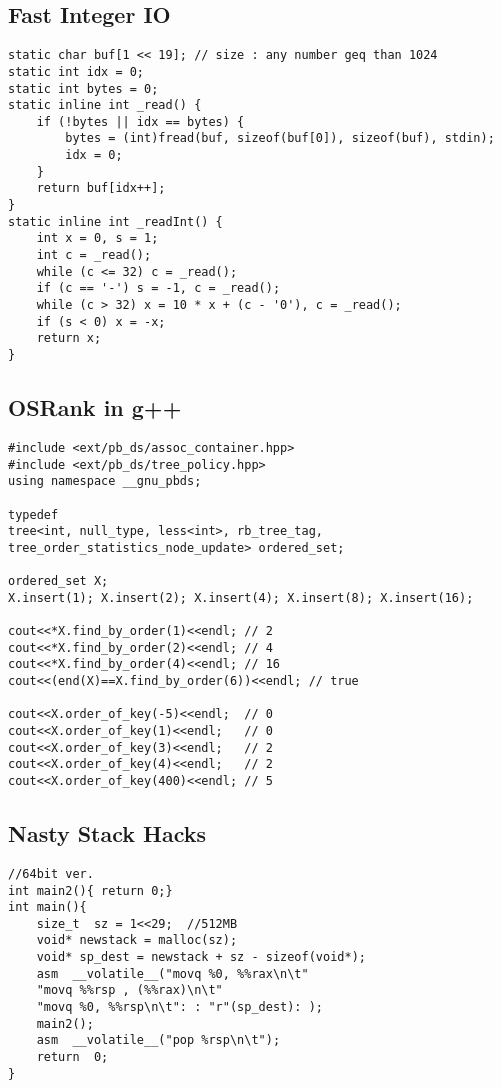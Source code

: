 \documentclass[landscape, 8pt, a4paper, oneside,  twocolumn]{extarticle}
\begin{document}
\subsection {Fast Integer IO}
\begin{verbatim}
static char buf[1 << 19]; // size : any number geq than 1024 
static int idx = 0;
static int bytes = 0;
static inline int _read() {
	if (!bytes || idx == bytes) {
		bytes = (int)fread(buf, sizeof(buf[0]), sizeof(buf), stdin);
		idx = 0;
	}
	return buf[idx++];
}
static inline int _readInt() {
	int x = 0, s = 1;
	int c = _read();
	while (c <= 32) c = _read();
	if (c == '-') s = -1, c = _read();
	while (c > 32) x = 10 * x + (c - '0'), c = _read();
	if (s < 0) x = -x;
	return x;
}
\end{verbatim}
\subsection {OSRank in g++}
\begin{verbatim}
#include <ext/pb_ds/assoc_container.hpp> 
#include <ext/pb_ds/tree_policy.hpp> 
using namespace __gnu_pbds; 

typedef
tree<int, null_type, less<int>, rb_tree_tag, tree_order_statistics_node_update> ordered_set;

ordered_set X;
X.insert(1); X.insert(2); X.insert(4); X.insert(8); X.insert(16);

cout<<*X.find_by_order(1)<<endl; // 2
cout<<*X.find_by_order(2)<<endl; // 4
cout<<*X.find_by_order(4)<<endl; // 16
cout<<(end(X)==X.find_by_order(6))<<endl; // true

cout<<X.order_of_key(-5)<<endl;  // 0
cout<<X.order_of_key(1)<<endl;   // 0
cout<<X.order_of_key(3)<<endl;   // 2
cout<<X.order_of_key(4)<<endl;   // 2
cout<<X.order_of_key(400)<<endl; // 5
\end{verbatim}

\subsection {Nasty Stack Hacks}
\begin{verbatim}
//64bit ver.
int main2(){ return 0;}
int main(){
	size_t  sz = 1<<29;  //512MB
	void* newstack = malloc(sz);
	void* sp_dest = newstack + sz - sizeof(void*);
	asm  __volatile__("movq %0, %%rax\n\t"
	"movq %%rsp , (%%rax)\n\t"
	"movq %0, %%rsp\n\t": : "r"(sp_dest): );
	main2();
	asm  __volatile__("pop %rsp\n\t");
	return  0;
}
\end{verbatim}
\end{document}
